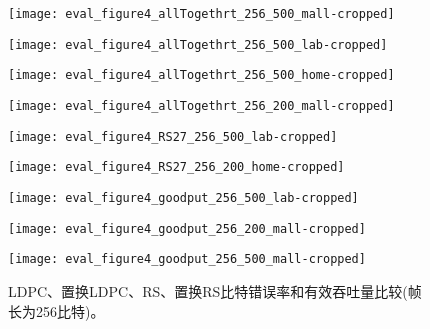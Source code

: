 \begin{figure}[t]
	\begin{minipage}[b]{.32\linewidth}
		\texttt{[image: eval\_figure4\_allTogethrt\_256\_500\_mall-cropped]}
		\label{fig:ber_500_mall}
	\end{minipage}
	\hfill
	\begin{minipage}[b]{.32\linewidth}
		\texttt{[image: eval\_figure4\_allTogethrt\_256\_500\_lab-cropped]}
		\label{fig:ber_500_lab}
	\end{minipage}
	\hfill
	\begin{minipage}[b]{.32\linewidth}
		\texttt{[image: eval\_figure4\_allTogethrt\_256\_500\_home-cropped]}
		\label{fig:ber_500_home}
	\end{minipage}
	
	\begin{minipage}[b]{.32\linewidth}
		\texttt{[image: eval\_figure4\_allTogethrt\_256\_200\_mall-cropped]}
		\label{fig:ber_200_mall}
	\end{minipage}
	\hfill
	\begin{minipage}[b]{.32\linewidth}
		\texttt{[image: eval\_figure4\_RS27\_256\_500\_lab-cropped]}
		\label{fig:ber_500_lab_cr}
	\end{minipage}
	\hfill
	\begin{minipage}[b]{.32\linewidth}
		\texttt{[image: eval\_figure4\_RS27\_256\_200\_home-cropped]}
		\label{fig:ber_500_home_cr}
	\end{minipage}
	
	\begin{minipage}[b]{.32\linewidth}
		\texttt{[image: eval\_figure4\_goodput\_256\_500\_lab-cropped]}
		\label{fig:goodput_500_lab}
	\end{minipage}
	\hfill
	\begin{minipage}[b]{.32\linewidth}
		\texttt{[image: eval\_figure4\_goodput\_256\_200\_mall-cropped]}
		\label{fig:goodput_200_lab}
	\end{minipage}
	\hfill
	\begin{minipage}[b]{.32\linewidth}
		\texttt{[image: eval\_figure4\_goodput\_256\_500\_mall-cropped]}
		\label{fig:goodput_500_mall}
	\end{minipage}
	
	\caption{LDPC、置换LDPC、RS、置换RS比特错误率和有效吞吐量比较(帧长为256比特)。}\label{fig:ber}
\end{figure}
